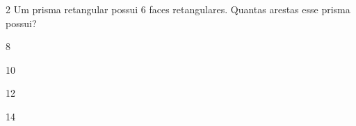 
\num{2} Um prisma retangular possui 6 faces retangulares. Quantas arestas
esse prisma possui?


\begin{multicols}{2}
\begin{escolha}[itemsep=0pt]
\item 8
\item 10
\item 12
\item 14
\end{escolha}
\end{multicols}



